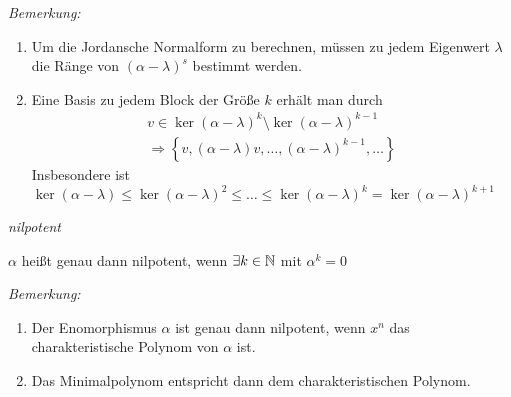 \textit{Bemerkung:}
    \begin{enumerate}
        \item Um die Jordansche Normalform zu berechnen, müssen zu jedem Eigenwert $\lambda$ die Ränge von $(\alpha - \lambda)^s$ bestimmt werden.
        \item Eine Basis zu jedem Block der Größe $k$ erhält man durch
            \begin{align*}
                v \in \ker(\alpha - \lambda)^k \setminus \ker (\alpha - \lambda)^{k-1} \\
                \Rightarrow
                \left\{
                    v,(\alpha - \lambda)v,\ldots,(\alpha - \lambda)^{k-1},\ldots
                \right\}
            \end{align*}
            Insbesondere ist $\ker(\alpha - \lambda) \leq \ker(\alpha - \lambda)^2 \leq \ldots \leq \ker(\alpha - \lambda)^k = \ker(\alpha - \lambda)^{k+1}$
    \end{enumerate}


\begin{mydef}\textit{nilpotent}

    $\alpha$ heißt genau dann nilpotent, wenn $\exists k \in \mathbb{N}$ mit $\alpha^k=0$
\end{mydef}

\textit{Bemerkung:}
    \begin{enumerate}
        \item Der Enomorphismus $\alpha$ ist genau dann nilpotent, wenn $x^n$ das charakteristische Polynom von $\alpha$ ist.
        \item Das Minimalpolynom entspricht dann dem charakteristischen Polynom.
    \end{enumerate}
